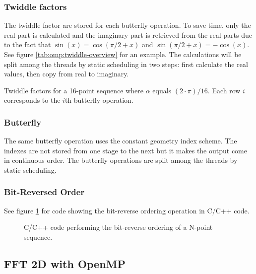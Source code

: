 \subsubsection{Twiddle factors}

The twiddle factor are stored for each butterfly operation. To save time, only the real part is calculated and the imaginary part is retrieved from the real parts due to the fact that $\sin(x) = \cos(\pi/2 + x)$ and $\sin(\pi/2 + x) = -\cos(x)$. See figure \ref{tab:omp:twiddle-overview} for an example. The calculations will be split among the threads by static scheduling in two steps: first calculate the real values, then copy from real to imaginary.

\begin{table}
	\centering
	
	\caption{Twiddle factors for a 16-point sequence where $\alpha$ equals $(2 \cdot \pi) / 16$. Each row $i$ corresponds to the $i$th butterfly operation.}
	\label{tab:omp:twiddle-overview}
\end{table}

\subsubsection{Butterfly}

The same butterfly operation uses the constant geometry index scheme. The indexes are not stored from one stage to the next but it makes the output come in continuous order. The butterfly operations are split among the threads by static scheduling.

\subsubsection{Bit-Reversed Order}

See figure \ref{fig:omp:bit-reverse-order} for code showing the bit-reverse ordering operation in C/C++ code.

\begin{figure}
	\centering
	\begin{framed}
			
	\end{framed}
	\caption{ C/C++ code performing the bit-reverse ordering of a N-point sequence. }
	\label{fig:omp:bit-reverse-order}
\end{figure}

\subsection{FFT 2D with OpenMP}

